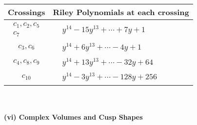\documentclass[1p]{elsarticle_modified}
\theoremstyle{definition}
\begin{document}
\begin{tabular}{m{50pt}|m{274pt}}
Crossings & \hspace{64pt}Riley Polynomials at each crossing \\
\hline $$\begin{aligned}c_{1},c_{2},c_{5}\\c_{7}\end{aligned}$$&$\begin{aligned}
&y^{14}-15 y^{13}+\cdots+7 y+1
\end{aligned}$\\
\hline $$\begin{aligned}c_{3},c_{6}\end{aligned}$$&$\begin{aligned}
&y^{14}+6 y^{13}+\cdots-4 y+1
\end{aligned}$\\
\hline $$\begin{aligned}c_{4},c_{8},c_{9}\end{aligned}$$&$\begin{aligned}
&y^{14}+13 y^{13}+\cdots-32 y+64
\end{aligned}$\\
\hline $$\begin{aligned}c_{10}\end{aligned}$$&$\begin{aligned}
&y^{14}-3 y^{13}+\cdots-128 y+256
\end{aligned}$\\
\hline
\end{tabular}\\~\\
\newpage\flushleft \textbf{(vi) Complex Volumes and Cusp Shapes}
\end{document}
